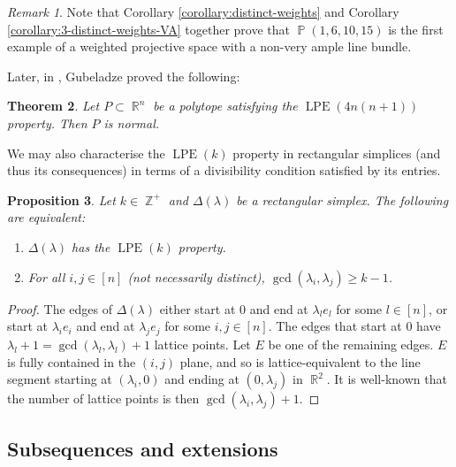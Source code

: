 \documentclass[a4paper,11pt]{amsart}
\theoremstyle{plain}
\newtheorem{theorem}{Theorem}[section]
\newtheorem{proposition}[theorem]{Proposition}
\theoremstyle{definition}
\theoremstyle{remark}
\newtheorem{remark}[theorem]{Remark}
\DeclareMathOperator{\ZZ}{\mathbb{Z}}
\DeclareMathOperator{\RR}{\mathbb{R}}
\DeclareMathOperator{\PP}{\mathbb{P}}
\DeclareMathOperator{\LPE}{LPE}
\begin{document}
\begin{remark}
    Note that Corollary \ref{corollary:distinct-weights} and Corollary \ref{corollary:3-distinct-weights-VA} together prove that $\PP(1,6,10,15)$ is the first example of a weighted projective space with a non-very ample line bundle.
\end{remark}

Later, in \cite{Gubeladze:2012}, Gubeladze proved the following:

\begin{theorem}\label{theorem:gubeladze-lpe}\cite[Theorem 1.3]{Gubeladze:2012}
    Let $P \subset \RR^n$ be a polytope satisfying the $\LPE(4n(n + 1))$ property. Then $P$ is normal.
\end{theorem}

We may also characterise the $\LPE(k)$ property in rectangular simplices (and thus its consequences) in terms of a divisibility condition satisfied by its entries.

\begin{proposition}\label{proposition:lpe-characterisation}
    Let $k \in \ZZ^+$ and $\Delta(\lambda)$ be a rectangular simplex. The following are equivalent:
    \begin{enumerate}[1.]
        \item $\Delta(\lambda)$ has the $\LPE(k)$ property.
        \item For all $i, j \in [n]$ (not necessarily distinct), $\gcd(\lambda_i, \lambda_j) \geq k - 1$.
    \end{enumerate}
\end{proposition}

\begin{proof}
    The edges of $\Delta(\lambda)$ either start at $0$ and end at $\lambda_le_l$ for some $l \in [n]$, or start at $\lambda_ie_i$ and end at $\lambda_je_j$ for some $i, j \in [n]$. The edges that start at $0$ have $\lambda_l + 1 = \gcd(\lambda_l, \lambda_l) + 1$ lattice points. Let $E$ be one of the remaining edges. $E$ is fully contained in the $(i, j)$ plane, and so is lattice-equivalent to the line segment starting at $(\lambda_i, 0)$ and ending at $(0, \lambda_j)$ in $\RR^2$. It is well-known that the number of lattice points is then $\gcd(\lambda_i, \lambda_j) + 1$. 
\end{proof}

\subsection{Subsequences and extensions}\label{subsection:subsequences-and-extensions} \hfill
\end{document}
